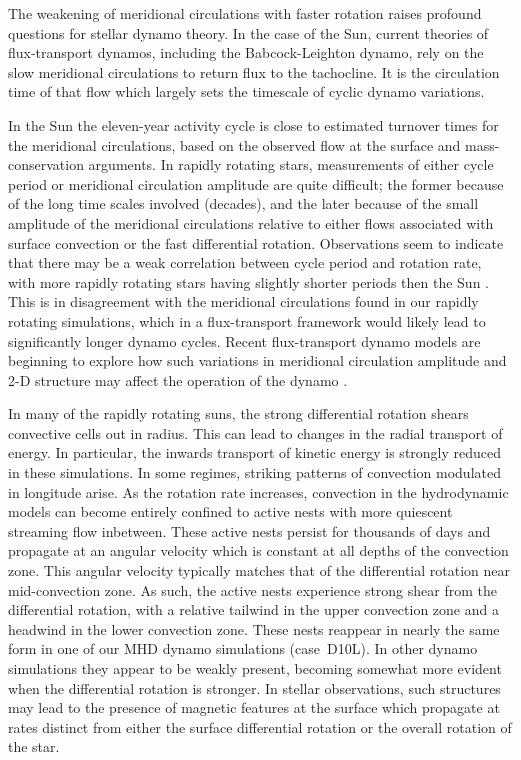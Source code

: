 \clearpage
The weakening of meridional circulations with faster rotation raises
profound questions for stellar dynamo theory.  In the case of the Sun,
current theories of flux-transport dynamos, including the
Babcock-Leighton dynamo, rely on the slow meridional circulations to
return flux to the tachocline.  It is the circulation time of that
flow which largely sets the timescale of cyclic dynamo variations.

In the Sun the eleven-year activity cycle is close to estimated
turnover times for the meridional circulations, based on the observed
flow at the surface and mass-conservation arguments. In rapidly
rotating stars, measurements of either cycle period or meridional
circulation amplitude are quite difficult; the former because of the
long time scales involved (decades), and the later because of the
small amplitude of the meridional circulations relative to either
flows associated with surface convection or the fast differential
rotation.  Observations seem to indicate that there may be a weak
correlation between cycle period and rotation rate, with more rapidly
rotating stars having slightly shorter periods then the Sun
\citep{Saar&Brandenburg_1999}.  This is in disagreement with the
meridional circulations found in our rapidly rotating simulations,
which in a flux-transport framework would likely lead to significantly
longer dynamo cycles.  
Recent flux-transport dynamo models are beginning to explore how 
such variations in meridional circulation amplitude and 2-D structure may
affect the operation of the dynamo \citep[e.g.,][]{Jouve_et_al_2009}.


In many of the rapidly rotating suns, the strong
differential rotation shears convective cells out in radius.  This can
lead to changes in the radial transport of energy.  In particular, the
inwards transport of kinetic energy is strongly reduced in these
simulations.  In some
regimes, striking patterns of 
convection modulated in longitude arise.  As the rotation rate
increases, convection in the hydrodynamic models can become entirely confined to active nests
with more quiescent streaming flow inbetween.  These active nests
persist for thousands of days and propagate at an angular velocity
which is constant at all depths of the convection zone.  This angular
velocity typically matches that of the differential rotation near
mid-convection zone.  As such, the active nests experience strong shear
from the differential rotation, with a relative tailwind in the upper
convection zone and a headwind in the lower convection zone.  These
nests reappear in nearly the same form in one of our MHD dynamo
simulations (case~D10L).  In other dynamo simulations they appear to
be weakly present, becoming somewhat more evident when the differential
rotation is stronger.  In stellar observations, such structures may
lead to the presence of magnetic features at the surface which
propagate at rates distinct from either the surface differential
rotation or the overall rotation of the star.

